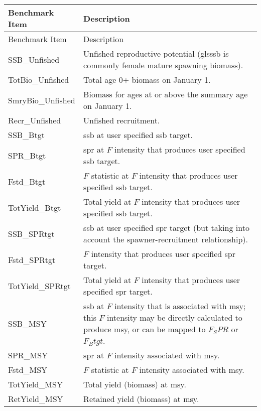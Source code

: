 \begin{center}
	\begin{longtable}{p{4cm} p{11cm}}
		\hline
		Benchmark Item & Description \Tstrut\Bstrut\\
		\hline
		\endfirsthead

		\hline
		Benchmark Item & Description \Tstrut\Bstrut\\
		\hline
		\endhead
		
		\endfoot
		\hline		
		\endlastfoot
		
		SSB\_Unfished \Tstrut & Unfished reproductive potential (gls{ssb} is commonly female mature spawning biomass). \\
		TotBio\_Unfished \Tstrut & Total age 0+ biomass on January 1. \\
		SmryBio\_Unfished \Tstrut & Biomass for ages at or above the summary age on January 1. \\
		Recr\_Unfished \Tstrut & Unfished recruitment. \\
		SSB\_Btgt \Tstrut & \gls{ssb} at user specified \gls{ssb} target. \\
		SPR\_Btgt \Tstrut & \gls{spr} at $F$ intensity that produces user specified \gls{ssb} target. \\
		Fstd\_Btgt \Tstrut & $F$ statistic at $F$ intensity that produces user specified \gls{ssb} target. \\
		TotYield\_Btgt \Tstrut & Total yield at $F$ intensity that produces user specified \gls{ssb} target. \\
		SSB\_SPRtgt \Tstrut & \gls{ssb} at user specified \gls{spr} target (but taking into account the spawner-recruitment relationship). \\
		Fstd\_SPRtgt \Tstrut & $F$ intensity that produces user specified \gls{spr} target. \\
		TotYield\_SPRtgt \Tstrut & Total yield at $F$ intensity that produces user specified \gls{spr} target. \\
		SSB\_MSY \Tstrut & \gls{ssb} at $F$ intensity that is associated with \gls{msy}; this $F$ intensity may be directly calculated to produce \gls{msy}, or can be mapped to $F_SPR$ or $F_Btgt$. \\
		SPR\_MSY \Tstrut & \gls{spr} at $F$ intensity associated with \gls{msy}. \\
		Fstd\_MSY \Tstrut & $F$ statistic at $F$ intensity associated with \gls{msy}. \\
		TotYield\_MSY \Tstrut & Total yield (biomass) at \gls{msy}. \\
		RetYield\_MSY \Tstrut & Retained yield (biomass) at \gls{msy}. \Bstrut\\ 
	\end{longtable}
\end{center}

